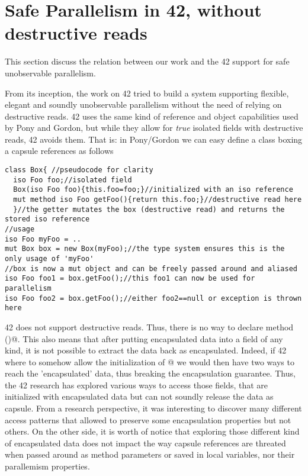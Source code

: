 \section{Safe Parallelism in 42, without destructive reads}
\label{s:parallelism}
This section discuss the relation between our work and the 42 support for safe unobservable parallelism.

From its inception, the work on 42 tried to build a system supporting flexible, elegant and soundly unobservable parallelism without the need of relying on destructive reads.
42 uses  the same kind of reference and object capabilities used by Pony and Gordon, but while they allow for \emph{true} isolated fields with destructive reads, 42 avoids them.
That is: in Pony/Gordon we can easy define a class boxing a capsule references as follows
\begin{lstlisting}
class Box{ //pseudocode for clarity
  iso Foo foo;//isolated field
  Box(iso Foo foo){this.foo=foo;}//initialized with an iso reference
  mut method iso Foo getFoo(){return this.foo;}//destructive read here
  }//the getter mutates the box (destructive read) and returns the stored iso reference
//usage
iso Foo myFoo = ..
mut Box box = new Box(myFoo);//the type system ensures this is the only usage of 'myFoo'
//box is now a mut object and can be freely passed around and aliased
iso Foo foo1 = box.getFoo();//this foo1 can now be used for parallelism
iso Foo foo2 = box.getFoo();//either foo2==null or exception is thrown here
\end{lstlisting}
42 does not support destructive reads. Thus, there is no way to declare method \Q@getFoo()@.
This also means that after putting encapsulated data into a field of any kind, it is not possible to extract the data back as encapsulated.
Indeed, if 42 where to somehow allow the initialization of @ we would then have two ways to reach the 'encapsulated' data, thus breaking the encapsulation guarantee.
Thus, the 42 research has explored various ways to access those fields, that are initialized with encapsulated data but can not soundly release the data as capsule.
From a research perspective, it was interesting to discover many different access patterns that allowed to preserve some encapsulation properties but not others.
On the other side, it is worth of notice that exploring those different kind of encapsulated data does not impact the way capsule references are threated when passed around as method parameters or saved in local variables, nor their parallemism properties.

